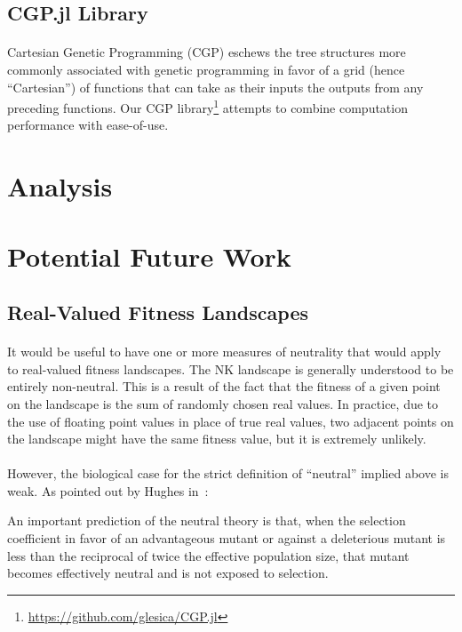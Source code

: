 \documentclass[12pt,letterpaper,titlepage]{article}
\begin{document}
\subsection{CGP.jl Library}

\paragraph{}
Cartesian Genetic Programming (CGP) eschews the tree structures more commonly
associated with genetic programming in favor of a grid (hence ``Cartesian'') of
functions that can take as their inputs the outputs from any preceding
functions. Our CGP library\footnote{\url{https://github.com/glesica/CGP.jl}}
attempts to combine computation performance with ease-of-use.

\section{Analysis}

\section{Potential Future Work}

\subsection{Real-Valued Fitness Landscapes}

\paragraph{}
It would be useful to have one or more measures of neutrality that would apply
to real-valued fitness landscapes. The NK landscape is generally understood to
be entirely non-neutral. This is a result of the fact that the fitness of a
given point on the landscape is the sum of randomly chosen real values. In
practice, due to the use of floating point values in place of true real values,
two adjacent points on the landscape might have the same fitness value, but it
is extremely unlikely.

\paragraph{}
However, the biological case for the strict definition of ``neutral'' implied
above is weak. As pointed out by Hughes in~\cite{Hughes2007}:

\begin{displayquote}
An important prediction of the neutral theory is that, when the selection
coefficient in favor of an advantageous mutant or against a deleterious mutant
is less than the reciprocal of twice the effective population size, that mutant
becomes effectively neutral and is not exposed to selection.
\end{displayquote}
\end{document}
